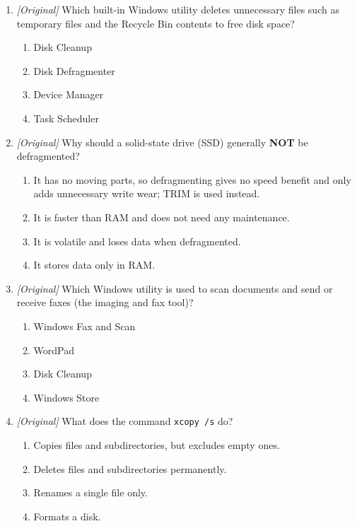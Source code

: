 \documentclass[11pt]{article}
\begin{document}
\begin{enumerate}[label=\textbf{Q\arabic*.}, leftmargin=*]
\begin{enumerate}[label=\Alph*.]
    \item Both are spreadsheet programs.
    \item WordPad cannot save a file in any format.
  \end{enumerate}
\item \textit{[Original]} Which built-in Windows utility deletes unnecessary
  files such as temporary files and the Recycle Bin contents to free disk
  space?
  \begin{enumerate}[label=\Alph*.]
    \item Disk Cleanup
    \item Disk Defragmenter
    \item Device Manager
    \item Task Scheduler
  \end{enumerate}
\item \textit{[Original]} Why should a solid-state drive (SSD) generally
  \textbf{NOT} be defragmented?
  \begin{enumerate}[label=\Alph*.]
    \item It has no moving parts, so defragmenting gives no speed benefit and
      only adds unnecessary write wear; TRIM is used instead.
    \item It is faster than RAM and does not need any maintenance.
    \item It is volatile and loses data when defragmented.
    \item It stores data only in RAM.
  \end{enumerate}
\item \textit{[Original]} Which Windows utility is used to scan documents and
  send or receive faxes (the imaging and fax tool)?
  \begin{enumerate}[label=\Alph*.]
    \item Windows Fax and Scan
    \item WordPad
    \item Disk Cleanup
    \item Windows Store
  \end{enumerate}
\item \textit{[Original]} What does the command \texttt{xcopy /s} do?
  \begin{enumerate}[label=\Alph*.]
    \item Copies files and subdirectories, but excludes empty ones.
    \item Deletes files and subdirectories permanently.
    \item Renames a single file only.
    \item Formats a disk.
  \end{enumerate}


\end{enumerate}
\end{document}
